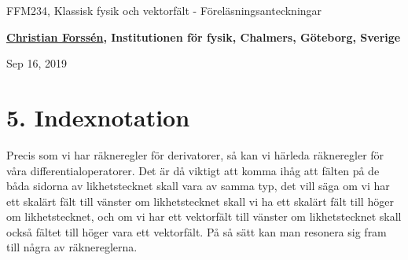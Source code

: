 \documentclass[%
oneside,                 %
final,                   %
10pt]{article}
\begin{document}

\newcommand{\exercisesection}[1]{\subsection*{#1}}







\thispagestyle{empty}

\begin{center}
{\LARGE\bf
\begin{spacing}{1.25}
FFM234, Klassisk fysik och vektorfält - Föreläsningsanteckningar
\end{spacing}
}
\end{center}


\begin{center}
{\bf \href{{http://fy.chalmers.se/subatom/tsp/}}{Christian Forssén}, Institutionen för fysik, Chalmers, Göteborg, Sverige${}^{}$} \\ [0mm]
\end{center}

\begin{center}
\end{center}
    

\begin{center}
Sep 16, 2019
\end{center}

\vspace{1cm}


\section*{5. Indexnotation}

Precis som vi har räkneregler för derivatorer, så kan vi härleda räkneregler för våra differentialoperatorer. Det är då viktigt att komma ihåg att fälten på de båda sidorna av likhetstecknet skall vara av samma typ, det vill säga om vi har ett skalärt fält till vänster om likhetstecknet skall vi ha ett skalärt fält till höger om likhetstecknet, och om vi har ett vektorfält till vänster om likhetstecknet skall också fältet till höger vara ett vektorfält.  På så sätt kan man resonera sig fram till några av räknereglerna.
\end{document}

